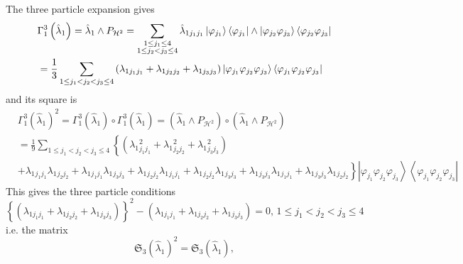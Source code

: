 \documentclass[12pt]{article}
\begin{document}
The three particle expansion gives 
\begin{align*}
& \Gamma _{1}^{3}\left( \hat{\lambda}_{1}\right) =\hat{\lambda}_{1}\wedge P_{%
\mathcal{H}^{2}}=\sum_{\substack{ 1\leq j_{1}\leq 4  \\ 1\leq
j_{2}<j_{3}\leq 4}}\hat{\lambda}_{1j_{1}j_{1}}\left\vert \varphi
_{j_{1}}\right\rangle \left\langle \varphi _{j_{1}}\right\vert \wedge
\left\vert \varphi _{j_{2}}\varphi _{j_{3}}\right\rangle \left\langle
\varphi _{j_{2}}\varphi _{j_{3}}\right\vert \\
& =\frac{1}{3}\sum_{1\leq j_{1}<j_{2}<j_{3}\leq 4}\left( \lambda
_{1j_{1}j_{1}}+\lambda _{1j_{2}j_{2}}+\lambda _{1j_{3}j_{3}}\right)
\left\vert \varphi _{j_{1}}\varphi _{j_{2}}\varphi _{j_{3}}\right\rangle
\left\langle \varphi _{j_{1}}\varphi _{j_{2}}\varphi _{j_{3}}\right\vert
\end{align*}%
and its square is 
\begin{align*}
& \Gamma _{1}^{3}\left( \hat{\lambda}_{1}\right) ^{2}=\Gamma _{1}^{3}\left( 
\hat{\lambda}_{1}\right) \circ \Gamma _{1}^{3}\left( \hat{\lambda}%
_{1}\right) =\left( \hat{\lambda}_{1}\wedge P_{\mathcal{H}^{2}}\right) \circ
\left( \hat{\lambda}_{1}\wedge P_{\mathcal{H}^{2}}\right) \\
& =\frac{1}{9}\sum_{1\leq j_{1}<j_{2}<j_{3}\leq 4}\left\{ \left( \lambda
_{1}{}_{j_{1}j_{1}}^{2}+\lambda _{1}{}_{j_{2}j_{2}}^{2}+\lambda
_{1}{}_{j_{3}j_{3}}^{2}\right) \right. \\
& +\lambda _{1}{}_{j_{1}j_{1}}\lambda _{1}{}_{j_{2}j_{2}}+\lambda
_{1}{}_{j_{1}j_{1}}\lambda _{1}{}_{j_{3}j_{3}}+\lambda
_{1}{}_{j_{2}j_{2}}\lambda _{1}{}_{j_{1}j_{1}}+\lambda
_{1}{}_{j_{2}j_{2}}\lambda _{1}{}_{j_{3}j_{3}}+\left. \lambda
_{1}{}_{j_{3}j_{3}}\lambda _{1}{}_{j_{1}j_{1}}+\lambda
_{1}{}_{j_{3}j_{3}}\lambda _{1}{}_{j_{2}j_{2}}\right\} \left\vert \varphi
_{j_{1}}\varphi _{j_{2}}\varphi _{j_{3}}\right\rangle \left\langle \varphi
_{j_{1}}\varphi _{j_{2}}\varphi _{j_{3}}\right\vert
\end{align*}%
This gives the three particle conditions%
\begin{equation*}
\left\{ \left( \lambda _{1j_{1}j_{1}}+\lambda _{1j_{2}j_{2}}+\lambda
_{1}{}_{j_{3}j_{3}}\right) \right\} ^{2}-\left( \lambda
_{1j_{1}j_{1}}+\lambda _{1j_{2}j_{2}}+\lambda _{1}{}_{j_{3}j_{3}}\right)
=0,\,1\leq j_{1}<j_{2}<j_{3}\leq 4 
\end{equation*}%
i.e. the matrix 
\begin{equation*}
\mathfrak{S}_{3}\left( \hat{\lambda}_{1}\right) ^{2}=\mathfrak{S}_{3}\left( 
\hat{\lambda}_{1}\right) , 
\end{equation*}%
\end{document}
